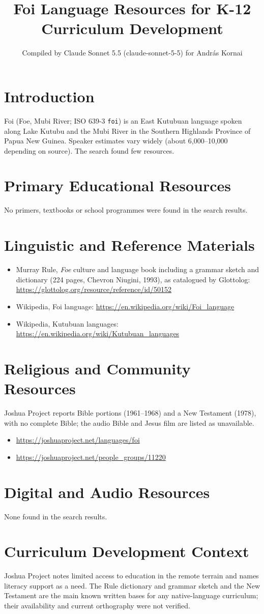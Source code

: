 \documentclass[12pt]{article}
\title{Foi Language Resources for K-12 Curriculum Development}
\author{Compiled by Claude Sonnet 5.5 (claude-sonnet-5-5) for Andr\'as Kornai}
\date{}
\begin{document}
\maketitle

\section{Introduction}
Foi (Foe, Mubi River; ISO 639-3 \texttt{foi}) is an East Kutubuan language spoken along Lake Kutubu and the Mubi River in the Southern Highlands Province of Papua New Guinea. Speaker estimates vary widely (about 6,000--10,000 depending on source). The search found few resources.

\section{Primary Educational Resources}
No primers, textbooks or school programmes were found in the search results.

\section{Linguistic and Reference Materials}
\begin{itemize}
\item Murray Rule, \emph{Foe} culture and language book including a grammar sketch and dictionary (224 pages, Chevron Niugini, 1993), as catalogued by Glottolog: \url{https://glottolog.org/resource/reference/id/50152}
\item Wikipedia, Foi language: \url{https://en.wikipedia.org/wiki/Foi_language}
\item Wikipedia, Kutubuan languages: \url{https://en.wikipedia.org/wiki/Kutubuan_languages}
\end{itemize}

\section{Religious and Community Resources}
Joshua Project reports Bible portions (1961--1968) and a New Testament (1978), with no complete Bible; the audio Bible and Jesus film are listed as unavailable.
\begin{itemize}
\item \url{https://joshuaproject.net/languages/foi}
\item \url{https://joshuaproject.net/people_groups/11220}
\end{itemize}

\section{Digital and Audio Resources}
None found in the search results.

\section{Curriculum Development Context}
Joshua Project notes limited access to education in the remote terrain and names literacy support as a need. The Rule dictionary and grammar sketch and the New Testament are the main known written bases for any native-language curriculum; their availability and current orthography were not verified.
\end{document}
